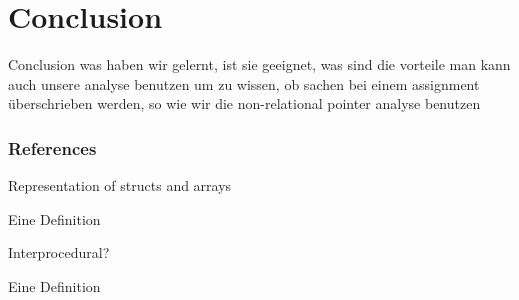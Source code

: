 \documentclass{beamer}
\begin{document}
\section{Conclusion}
\frame{\tableofcontents[currentsection]}

\begin{frame}{Conclusion}
    was haben wir gelernt, ist sie geeignet, was sind die vorteile
    man kann auch unsere analyse benutzen um zu wissen, ob sachen bei einem assignment überschrieben werden, so wie wir die non-relational pointer analyse benutzen
\end{frame}

\appendix

\begin{frame}[allowframebreaks]
    \frametitle{References}
    
    
\end{frame}

\begin{frame}{Representation of structs and arrays}
    \begin{Definition}
        Eine Definition
    \end{Definition}
\end{frame}



\begin{frame}{Interprocedural?}
    \begin{Definition}
        Eine Definition
    \end{Definition}
\end{frame}
\end{document}
